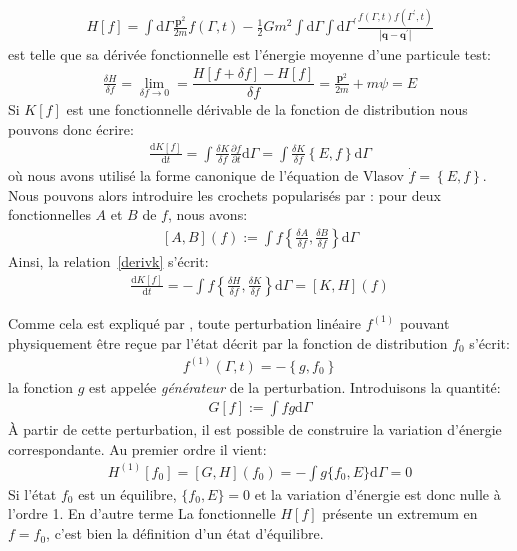 \begin{align*}
	H \left[ f \right]  =
	\int \mathrm{d} {\Gamma}
		\frac{\mathbf{p}^{2}}{2m} f \left( {\Gamma},t \right)
	- \frac{1}{2} Gm^2 \int \mathrm{d} {\Gamma} \int\mathrm{d}{\Gamma}^{\prime}
		\frac{f \left({\Gamma},t \right) f\left( {\Gamma}^{\prime},t\right)}%
		{\left\vert \mathbf{q} - \mathbf{q}^{\prime} \right\vert }
\end{align*}
est telle que sa dérivée fonctionnelle est l'énergie moyenne d'une particule test:
\begin{align*}
	\frac{\delta H}{\delta f}=\lim_{\delta f \to 0}=\dfrac{H\left[ f +\delta f\right]-H \left[ f \right]}{\delta f}
	= \frac{\mathbf{p}^{2}}{2m} + m \psi=E
\end{align*}
Si $K[f]$ est une fonctionnelle dérivable de la fonction de distribution nous pouvons donc écrire:
\begin{align}
	\frac{\mathrm{d} K[f]}{\mathrm{d} t}
	= \int \frac{\delta K}{\delta f}
		\frac{\partial f}{\partial t} \mathrm{d} \Gamma
	= \int \frac{\delta K}{\delta f} \left\{ E, f \right\} \mathrm{d} \Gamma
	\label{derivk}
\end{align}
où nous avons utilisé la forme canonique de l'équation de Vlasov $\dot f=\left\{ E, f \right\}$.
Nous pouvons alors introduire les crochets popularisés par \cite{morrison}: pour deux fonctionnelles $A$ et $B$ de $f$, nous avons:
\begin{align*}
	\left[ A, B \right](f) :=
	\int f \left\{
		\frac{\delta A}{\delta f}, \frac{\delta B}{\delta f}
	\right\} \mathrm{d} \Gamma
\end{align*}
Ainsi, la relation~\ref{derivk} s'écrit:
\begin{align}
	\frac{\mathrm{d} K[f]}{\mathrm{d} t}
	= - \int f \left\{
		\frac{\delta H}{\delta f}, \frac{\delta K}{\delta f}
	\right\} \mathrm{d} \Gamma
	= \left[K, H \right](f)
\end{align}

Comme cela est expliqué par \cite{kandrupstability}, toute perturbation linéaire $f^{(1)}$ pouvant physiquement être reçue par l'état décrit par la
fonction de distribution $f_0$ s'écrit:
\begin{align*}
	f^{(1)}\left(  {\Gamma},t \right) = -\left\{ g,f_{0}\right\}
\end{align*}
la fonction $g$ est appelée \emph{générateur} de la perturbation. Introduisons la quantité:
\begin{align*}
	G[f] := \int f g \mathrm{d} \Gamma
\end{align*}
À partir de cette perturbation, il est possible de construire la variation d'énergie correspondante. Au  premier ordre il vient:
\begin{align*}
	H^{(1)} [f_0] = \left[G, H \right](f_0)
	= - \int g \{ f_0, E \} \mathrm{d} \Gamma
	= 0
\end{align*}
Si l'état $f_0$ est un équilibre, $\{ f_0, E \} = 0$ et la variation d'énergie est donc nulle à l'ordre 1. En d'autre terme La fonctionnelle $H[f]$
présente un extremum en $f=f_0$, c'est bien la définition d'un état d'équilibre.

